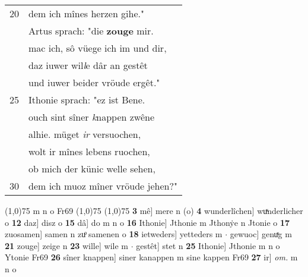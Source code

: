 \documentclass[8pt,a4paper,notitlepage]{article}
\begin{document}
\begin{table}[ht]
\begin{minipage}[t]{0.5\linewidth}
\begin{tabular}{rl}
20 & dem ich mînes herzen gihe."\\ 
 & Artus sprach: "die \textbf{zouge} mir.\\ 
 & mac ich, sô vüege ich im und dir,\\ 
 & daz iuwer wil\textit{l}e dâr an gestêt\\ 
 & und iuwer beider vröude ergêt."\\ 
25 & Ithonie sprach: "ez ist Bene.\\ 
 & ouch sint sîner \textit{k}nappen zwêne\\ 
 & alhie. müget \textit{ir} versuochen,\\ 
 & wolt ir mînes lebens ruochen,\\ 
 & ob mich der künic welle sehen,\\ 
30 & dem ich muoz mîner vröude jehen?"\\ 
\end{tabular}
\scriptsize
\line(1,0){75} \newline
m n o Fr69 \newline
\line(1,0){75} \newline
\newline
\line(1,0){75} \newline
\textbf{3} mê] mere n (o) \textbf{4} wunderlîchen] wuͯnderlicher o \textbf{12} daz] disz o \textbf{15} dâ] do m n o \textbf{16} Ithonie] Jthonie m Jthonẏe n Jtonie o \textbf{17} zuosamen] samen n zuͦ samenen o \textbf{18} ietweders] yetteders m  $\cdot$ gewuoc] genuͯg m \textbf{21} zouge] zeige n \textbf{23} wille] wile m  $\cdot$ gestêt] stet n \textbf{25} Ithonie] Jthonie m n o Ytonie Fr69 \textbf{26} sîner knappen] siner kanappen m sine kappen Fr69 \textbf{27} ir] \textit{om.} m n o \newline
\end{minipage}
\end{table}
\newpage
\end{document}

